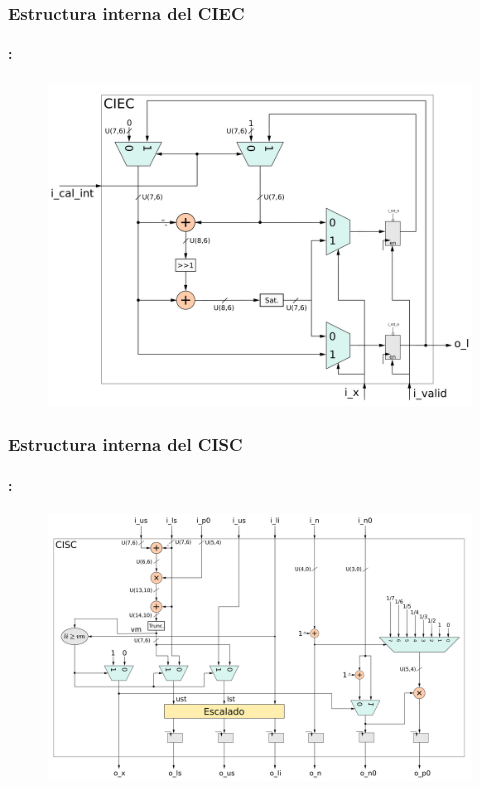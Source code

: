 \begin{frame}
  \frametitle{\textbf{\textbf{Estructura interna del CIEC}}}
      \framesubtitle{\secname : \subsecname}
        \begin{figure}
                \centering
            \includegraphics[width=0.8\linewidth]{Diagramas/internal_ciec.png}%
            \end{figure}
\end{frame}

\begin{frame}
  \frametitle{\textbf{\textbf{Estructura interna del CISC}}}
      \framesubtitle{\secname : \subsecname}
        \begin{figure}
                \centering
            \includegraphics[width=0.8\linewidth]{Diagramas/internal_cisc.png}%
            \end{figure}
\end{frame}


